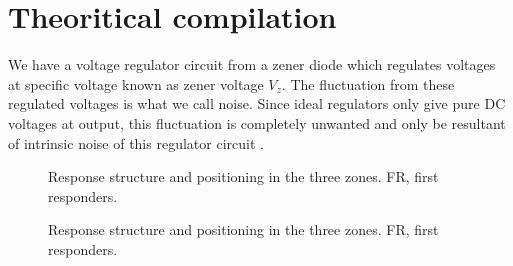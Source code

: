 \documentclass[final,5p,12pt,twocolumn]{elsaarticle}
\begin{document}
\section{Theoritical compilation}\label{Theory}

We have a voltage regulator circuit from a zener diode which regulates voltages at specific voltage known as zener voltage $V_{z}$. The fluctuation from these regulated voltages is what we call noise. Since ideal regulators only give pure DC voltages at output, this fluctuation is completely unwanted and only be resultant of intrinsic noise of this regulator circuit . 


\begin{figure}[hbt!]
\caption{Response structure and positioning in the three zones.
FR, first responders.\label{fig1}}
\end{figure}

\begin{figure}[hbt!]
\caption{Response structure and positioning in the three zones.
FR, first responders.\label{fig2}}
\end{figure}
\end{document}
